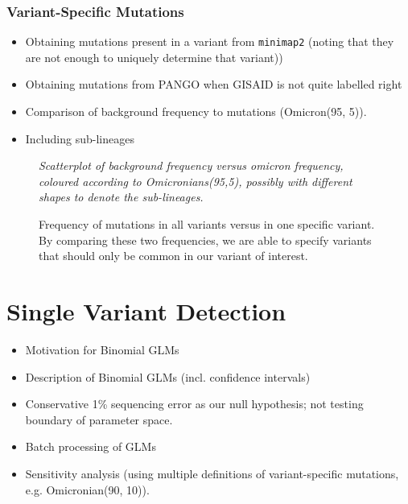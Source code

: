 \documentclass{article}
\newenvironment{tightemize}
{ \begin{itemize}
    \setlength{\itemsep}{0pt}
    \setlength{\parskip}{0pt}
    \setlength{\parsep}{0pt}     }
{ \end{itemize}                  }
\begin{document}
\subsubsection{Variant-Specific Mutations}

\begin{tightemize}
    \item Obtaining mutations present in a variant from \texttt{minimap2} (noting that they are not enough to uniquely determine that variant))
    \item Obtaining mutations from PANGO when GISAID is not quite labelled right
    \item Comparison of background frequency to mutations (Omicron(95, 5)). 
    \item Including sub-lineages
\end{tightemize}

\begin{figure}[ht!]
\vspace{2cm}
\centering
\emph{Scatterplot of background frequency versus omicron frequency, coloured according to Omicronians(95,5), possibly with different shapes to denote the sub-lineages.}
\vspace{2cm}
\caption{Frequency of mutations in all variants versus in one specific variant. By comparing these two frequencies, we are able to specify variants that should only be common in our variant of interest.}
\label{fig:mutation_frequency}
\end{figure}






\section{Single Variant Detection}

\begin{tightemize}
    \item Motivation for Binomial GLMs
    \item Description of Binomial GLMs (incl. confidence intervals)
    \item Conservative 1\% sequencing error as our null hypothesis; not testing boundary of parameter space.
    \item Batch processing of GLMs
    \item Sensitivity analysis (using multiple definitions of variant-specific mutations, e.g. Omicronian(90, 10)).
\end{tightemize}
\end{document}
